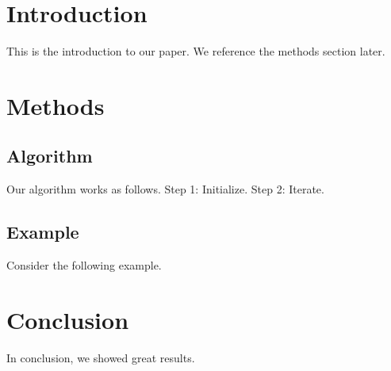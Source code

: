 \documentclass{article}
\begin{document}
\section{Introduction}
This is the introduction to our paper.
We reference the methods section later.

\section{Methods}
\subsection{Algorithm}
Our algorithm works as follows.
Step 1: Initialize.
Step 2: Iterate.
\subsection{Example}
Consider the following example.

\section{Conclusion}
In conclusion, we showed great results.
\end{document}
